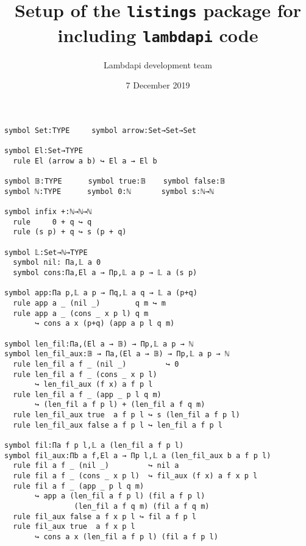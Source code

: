 \documentclass{article}
\title{Setup of the {\tt listings} package for including {\tt lambdapi} code}
\author{Lambdapi development team}
\date{7 December 2019}
\begin{document}
\maketitle

\small
\begin{lstlisting}
symbol Set:TYPE     symbol arrow:Set→Set→Set

symbol El:Set→TYPE
  rule El (arrow a b) ↪ El a → El b

symbol 𝔹:TYPE      symbol true:𝔹    symbol false:𝔹
symbol ℕ:TYPE      symbol 0:ℕ       symbol s:ℕ→ℕ

symbol infix +:ℕ→ℕ→ℕ
  rule     0 + q ↪ q
  rule (s p) + q ↪ s (p + q)

symbol 𝕃:Set→ℕ→TYPE
  symbol nil: Πa,𝕃 a 0
  symbol cons:Πa,El a → Πp,𝕃 a p → 𝕃 a (s p)

symbol app:Πa p,𝕃 a p → Πq,𝕃 a q → 𝕃 a (p+q)
  rule app a _ (nil _)        q m ↪ m
  rule app a _ (cons _ x p l) q m
       ↪ cons a x (p+q) (app a p l q m)

symbol len_fil:Πa,(El a → 𝔹) → Πp,𝕃 a p → ℕ
symbol len_fil_aux:𝔹 → Πa,(El a → 𝔹) → Πp,𝕃 a p → ℕ
  rule len_fil a f _ (nil _)         ↪ 0
  rule len_fil a f _ (cons _ x p l)
       ↪ len_fil_aux (f x) a f p l
  rule len_fil a f _ (app _ p l q m)
       ↪ (len_fil a f p l) + (len_fil a f q m)
  rule len_fil_aux true  a f p l ↪ s (len_fil a f p l)
  rule len_fil_aux false a f p l ↪ len_fil a f p l

symbol fil:Πa f p l,𝕃 a (len_fil a f p l)
symbol fil_aux:Πb a f,El a → Πp l,𝕃 a (len_fil_aux b a f p l)
  rule fil a f _ (nil _)         ↪ nil a
  rule fil a f _ (cons _ x p l)  ↪ fil_aux (f x) a f x p l
  rule fil a f _ (app _ p l q m)
       ↪ app a (len_fil a f p l) (fil a f p l)
                (len_fil a f q m) (fil a f q m)
  rule fil_aux false a f x p l ↪ fil a f p l
  rule fil_aux true  a f x p l
       ↪ cons a x (len_fil a f p l) (fil a f p l)
\end{lstlisting}
\end{document}

